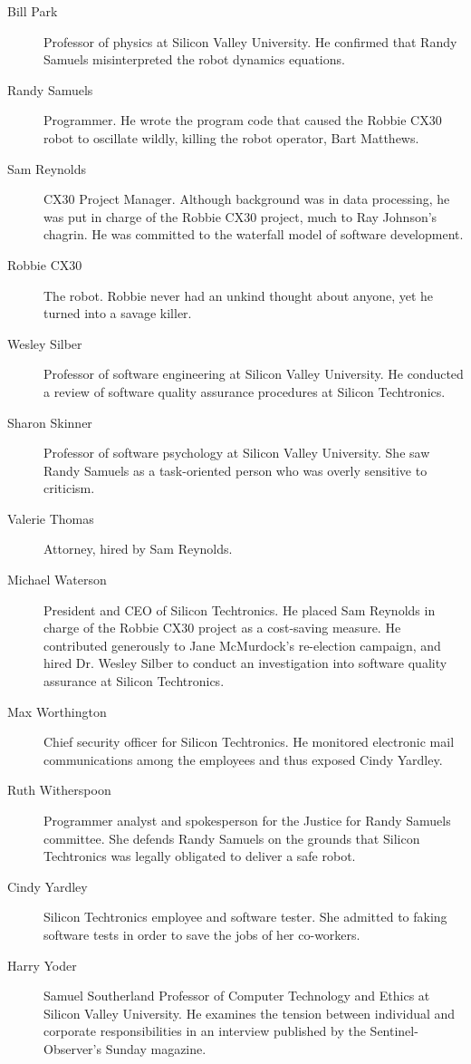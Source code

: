 \begin{description}
\item[Bill Park] Professor of physics at Silicon Valley University. He confirmed that Randy Samuels misinterpreted the robot dynamics equations.
\item[Randy Samuels] Programmer. He wrote the program code that caused the Robbie CX30 robot to oscillate wildly, killing the robot operator, Bart Matthews.
\item[Sam Reynolds] CX30 Project Manager. Although background was in data processing, he was put in charge of the Robbie CX30 project, much to Ray Johnson's chagrin. He was committed to the waterfall model of software development.
\item[Robbie CX30] The robot. Robbie never had an unkind thought about anyone, yet he turned into a savage killer.
\item[Wesley Silber] Professor of software engineering at Silicon Valley University. He conducted a review of software quality assurance procedures at Silicon Techtronics.
\item[Sharon Skinner] Professor of software psychology at Silicon Valley University. She saw Randy Samuels as a task-oriented person who was overly sensitive to criticism.
\item[Valerie Thomas] Attorney, hired by Sam Reynolds.
\item[Michael Waterson] President and CEO of Silicon Techtronics. He placed Sam Reynolds in charge of the Robbie CX30 project as a cost-saving measure. He contributed generously to Jane McMurdock's re-election campaign, and hired Dr. Wesley Silber to conduct an investigation into software quality assurance at Silicon Techtronics.
\item[Max Worthington] Chief security officer for Silicon Techtronics. He monitored electronic mail communications among the employees and thus exposed Cindy Yardley.
\item[Ruth Witherspoon] Programmer analyst and spokesperson for the Justice for Randy Samuels committee. She defends Randy Samuels on the grounds that Silicon Techtronics was legally obligated to deliver a safe robot.
\item[Cindy Yardley] Silicon Techtronics employee and software tester. She admitted to faking software tests in order to save the jobs of her co-workers.
\item[Harry Yoder] Samuel Southerland Professor of Computer Technology and Ethics at Silicon Valley University. He examines the tension between individual and corporate responsibilities in an interview published by the Sentinel-Observer's Sunday magazine. 
\end{description}
